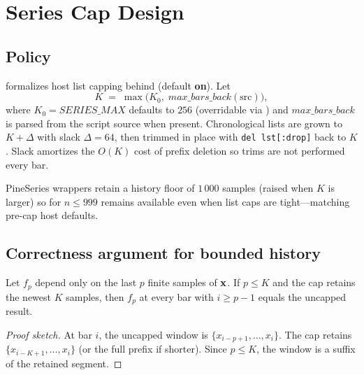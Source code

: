 \documentclass[11pt,a4paper]{article}
\begin{document}
\section{Series Cap Design}
\label{sec:cap}

\subsection{Policy}

\pyne{} formalizes host list capping behind 
(default \textbf{on}).  Let
\begin{equation}
  K \;=\; \max\!\big(K_0,\; \mathit{max\_bars\_back}(\mathrm{src})\big),
\end{equation}
where $K_0=\mathit{SERIES\_MAX}$ defaults to $256$ (overridable via
) and $\mathit{max\_bars\_back}$ is parsed from the
script source when present.  Chronological lists are grown to $K+\Delta$ with
slack $\Delta=64$, then trimmed in place with \texttt{del lst[:drop]} back to
$K$.  Slack amortizes the $O(K)$ cost of prefix deletion so trims are not
performed every bar.

PineSeries wrappers retain a history floor of $1\,000$ samples (raised when
$K$ is larger) so  for $n\le 999$ remains available even when
list caps are tight---matching pre-cap host defaults.

\subsection{Correctness argument for bounded history}

\begin{proposition}
\label{prop:window-cap}
Let $f_p$ depend only on the last $p$ finite samples of $\mathbf{x}$.  If
$p\le K$ and the cap retains the newest $K$ samples, then $f_p$ at every bar
with $i\ge p-1$ equals the uncapped result.
\end{proposition}

\begin{proof}[Proof sketch]
At bar $i$, the uncapped window is $\{x_{i-p+1},\ldots,x_i\}$.  The cap
retains $\{x_{i-K+1},\ldots,x_i\}$ (or the full prefix if shorter).  Since
$p\le K$, the window is a suffix of the retained segment.
\end{proof}
\end{document}
